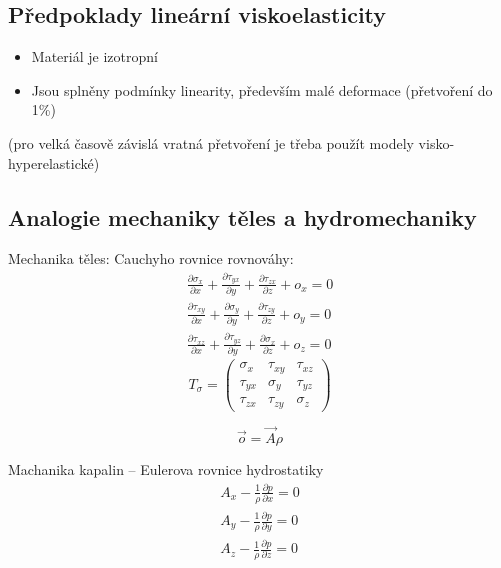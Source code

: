 \subsection{Předpoklady lineární viskoelasticity}
\begin{itemize}
	\item Materiál je izotropní
	\item Jsou splněny podmínky linearity, především malé deformace (přetvoření do 1\%)
\end{itemize}

(pro velká časově závislá vratná přetvoření je třeba použít modely visko-hyperelastické)

\subsection{Analogie mechaniky těles a hydromechaniky}
Mechanika těles:
Cauchyho rovnice rovnováhy:
\begin{align}
	\frac{\partial \sigma_x}{\partial x} +
	\frac{\partial \tau_{yx}}{\partial y} +
	\frac{\partial \tau_{zx}}{\partial z} + o_x = 0\\
	\frac{\partial \tau_{xy}}{\partial x} +
	\frac{\partial \sigma_y}{\partial y} +
	\frac{\partial \tau_{zy}}{\partial z} + o_y = 0\\
	\frac{\partial \tau_{xz}}{\partial x} +
	\frac{\partial \tau_{yz}}{\partial y} +
	\frac{\partial \sigma_x}{\partial z} + o_z = 0
\end{align}
\begin{equation}
	T_\sigma = \left( \begin{matrix}
		\sigma_x & \tau_{xy} & \tau_{xz}\\
		\tau_{yx} & \sigma_y & \tau_{yz}\\
		\tau_{zx} & \tau_{zy} & \sigma_z
	\end{matrix} \right)
\end{equation}

\begin{equation}
	\vec{o} = \vec{A} \rho
\end{equation}

Machanika kapalin -- Eulerova rovnice hydrostatiky
\begin{align}
	A_x - \frac{1}{\rho} \frac{\partial p}{\partial x} = 0\\
	A_y - \frac{1}{\rho} \frac{\partial p}{\partial y} = 0\\
	A_z - \frac{1}{\rho} \frac{\partial p}{\partial z} = 0
\end{align}

